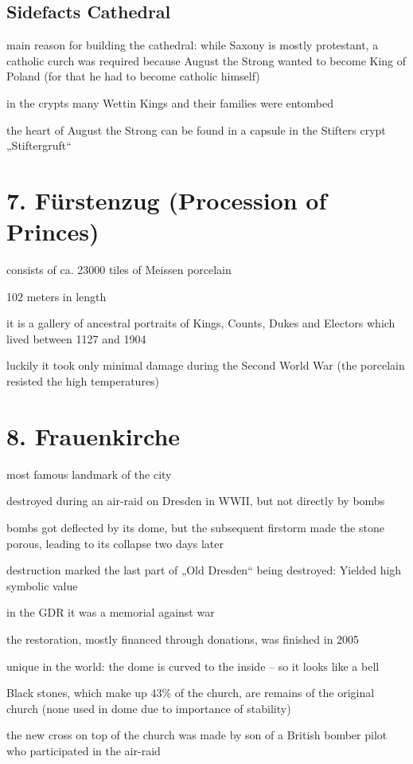 \documentclass[a4paper,12pt]{report}
\begin{document}
\subsection{Sidefacts Cathedral}
\begin{itemize*}
\item main reason for building the cathedral: while Saxony is mostly protestant, a catholic curch was required because August the Strong wanted to become King of Poland (for that he had to become catholic himself)
\item in the crypts many Wettin Kings and their families were entombed
\item the heart of August the Strong can be found in a capsule in the Stifters crypt „Stiftergruft“
\end{itemize*}

\section{7. Fürstenzug (Procession of Princes)}
\begin{itemize*}
\item consists of ca. 23000 tiles of Meissen porcelain
\item 102 meters in length
\item it is a gallery of ancestral portraits of Kings, Counts, Dukes and Electors which lived between 1127 and 1904
\item luckily it took only minimal damage during the Second World War (the porcelain resisted the high temperatures)
\end{itemize*}

\newpage

\section{8. Frauenkirche}
\begin{itemize*}
\item most famous landmark of the city
\item destroyed during an air-raid on Dresden in WWII, but not directly by bombs
    \begin{itemize*}
    \item bombs got deflected by its dome, but the subsequent firstorm made the stone porous, leading to its collapse two days later
    \item destruction marked the last part of „Old Dresden“ being destroyed: Yielded high symbolic value
    \end{itemize*}
\item in the GDR it was a memorial against war
\item the restoration, mostly financed through donations, was finished in 2005
\item unique in the world: the dome is curved to the inside – so it looks like a bell
\item Black stones, which make up 43\% of the church, are remains of the original church (none used in dome due to importance of stability)
\item the new cross on top of the church was made by son of a British bomber pilot who participated in the air-raid
\end{itemize*}
\end{document}

